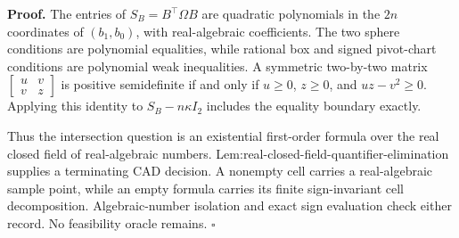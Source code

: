 \textbf{Proof.}
The entries of \(S_B=B^{\top}\Omega B\) are quadratic polynomials in the \(2n\) coordinates of \((b_1,b_0)\), with real-algebraic coefficients.  The two sphere conditions are polynomial equalities, while rational box and signed pivot-chart conditions are polynomial weak inequalities.  A symmetric two-by-two matrix \(\begin{bmatrix}u&v\\v&z\end{bmatrix}\) is positive semidefinite if and only if \(u\ge0\), \(z\ge0\), and \(uz-v^2\ge0\).  Applying this identity to \(S_B-n\kappa I_2\) includes the equality boundary exactly.

Thus the intersection question is an existential first-order formula over the real closed field of real-algebraic numbers.  Lem:real-closed-field-quantifier-elimination supplies a terminating CAD decision.  A nonempty cell carries a real-algebraic sample point, while an empty formula carries its finite sign-invariant cell decomposition.  Algebraic-number isolation and exact sign evaluation check either record.  No feasibility oracle remains. \(\square\)